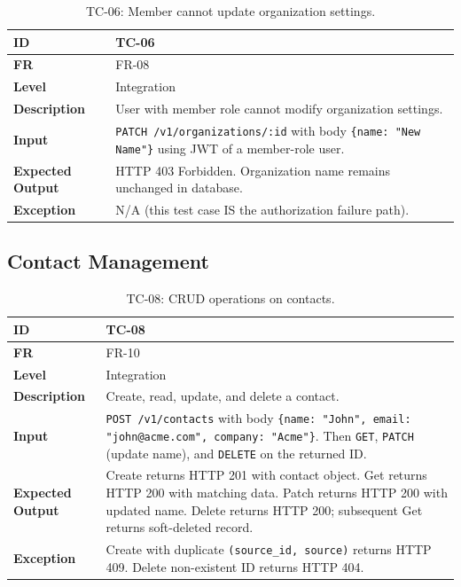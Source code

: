 \documentclass[a4paper]{article}
\begin{document}
\begin{table}[H]
\centering
\caption{TC-06: Member cannot update organization settings.}
\begin{tabular}{|p{3cm}|p{10.5cm}|}
\hline
\textbf{ID} & TC-06 \\
\hline
\textbf{FR} & FR-08 \\
\hline
\textbf{Level} & Integration \\
\hline
\textbf{Description} & User with member role cannot modify organization settings. \\
\hline
\textbf{Input} & \texttt{PATCH /v1/organizations/:id} with body \texttt{\{name: "New Name"\}} using JWT of a member-role user. \\
\hline
\textbf{Expected Output} & HTTP 403 Forbidden. Organization name remains unchanged in database. \\
\hline
\textbf{Exception} & N/A (this test case IS the authorization failure path). \\
\hline
\end{tabular}
\small
\end{table}

\subsection{Contact Management}

\begin{table}[H]
\centering
\caption{TC-08: CRUD operations on contacts.}
\begin{tabular}{|p{3cm}|p{10.5cm}|}
\hline
\textbf{ID} & TC-08 \\
\hline
\textbf{FR} & FR-10 \\
\hline
\textbf{Level} & Integration \\
\hline
\textbf{Description} & Create, read, update, and delete a contact. \\
\hline
\textbf{Input} & \texttt{POST /v1/contacts} with body \texttt{\{name: "John", email: "john@acme.com", company: "Acme"\}}. Then \texttt{GET}, \texttt{PATCH} (update name), and \texttt{DELETE} on the returned ID. \\
\hline
\textbf{Expected Output} & Create returns HTTP 201 with contact object. Get returns HTTP 200 with matching data. Patch returns HTTP 200 with updated name. Delete returns HTTP 200; subsequent Get returns soft-deleted record. \\
\hline
\textbf{Exception} & Create with duplicate \texttt{(source\_id, source)} returns HTTP 409. Delete non-existent ID returns HTTP 404. \\
\hline
\end{tabular}
\small
\end{table}
\end{document}

